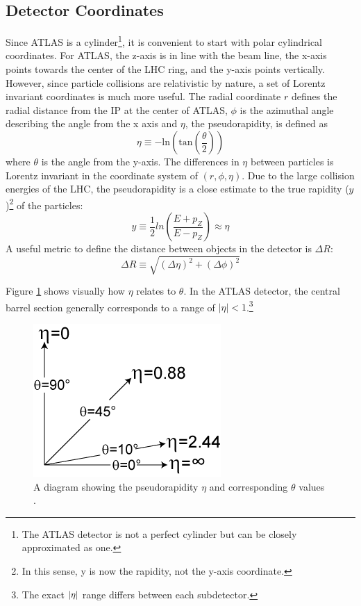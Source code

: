 	\subsection{Detector Coordinates}\label{ssec:coordinates}
		Since \gls{ATLAS} is a cylinder\footnote{The \gls{ATLAS} detector is not a perfect cylinder but can be closely approximated as one.}, it is convenient to start with polar cylindrical coordinates. For \gls{ATLAS}, the z-axis is in line with the beam line, the x-axis points towards the center of the \gls{LHC} ring, and the y-axis points vertically. However, since particle collisions are relativistic by nature, a set of Lorentz invariant coordinates is much more useful. The radial coordinate $r$ defines the radial distance from the \acrfull{IP} at the center of \gls{ATLAS}, $\phi$ is the azimuthal angle describing the angle from the x axis and $\eta$, the pseudorapidity, is defined as 
		\begin{equation}\label{eqn:eta}
		\eta \equiv - \mathrm{ln} \left( \mathrm{tan} \left( \frac{\theta}{2} \right) \right)
		\end{equation}
		where $\theta$ is the angle from the y-axis. The differences in $\eta$ between particles is Lorentz invariant in the coordinate system of $(r,\phi,\eta)$. Due to the large collision energies of the \gls{LHC}, the pseudorapidity is a close estimate to the true rapidity ($y$)\footnote{In this sense, y is now the rapidity, not the y-axis coordinate.} of the particles: 
		\begin{equation}\label{eqn:rapidity}
		y \equiv \frac{1}{2} ln(\frac{E+p_Z}{E-p_Z}) \approx \eta
		\end{equation}
		A useful metric to define the distance between objects in the detector is $\Delta R$:
		\begin{equation}\label{eqn:dR}
		\Delta R \equiv \sqrt{ (\Delta \eta)^2 + (\Delta \phi)^2}
		\end{equation}

		Figure \ref{fig:pseudorapidity} shows visually how $\eta$ relates to $\theta$. In the \gls{ATLAS} detector, the central barrel section generally corresponds to a range of $|\eta|<1$.\footnote{The exact $|{\eta}|$ range differs between each subdetector.} 

		\begin{figure}[!ht]
		\centering
		\includegraphics[width=.25\textwidth,keepaspectratio=true]{chapters/chapter3_experiment/images/Pseudorapidity.png}
		\caption{ A diagram showing the pseudorapidity $\eta$ and corresponding $\theta$ values \cite{pseudorapidity}. }
		\label{fig:pseudorapidity}
		\end{figure}

